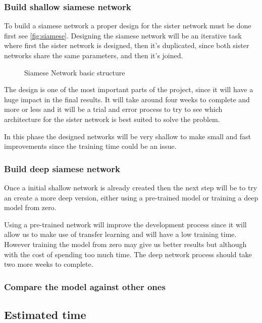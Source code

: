 \subsubsection{Build shallow siamese network}

To build a siamese network a proper design for the sister network must be done first
see \autoref{fig:siamese}. Designing the siamese network will be an iterative task where first
the sister network is designed, then it's duplicated, since both sister networks share the
same parameters, and then it's joined.

\begin{figure}
  \centering
  
  \caption{Siamese Network basic structure \label{fig:siamese}}
\end{figure}

The design is one of the most important parts of the project, since it will have a huge
impact in the final results. It will take around four weeks to complete and more or less
and it will be a trial and error process to try to see which architecture for the sister
network is best suited to solve the problem.

In this phase the designed networks will be very shallow to make small and fast improvements
since the training time could be an issue.

\subsubsection{Build deep siamese network}

Once a initial shallow network is already created then the next step will be to try an create
a more deep version, either using a pre-trained model or training a deep model from zero.

Using a pre-trained network will improve the development process since it will allow us
to make use of transfer learning and will have a low training time. However training the model
from zero may give us better results but although with the cost of spending too much time.
The deep network process should take two more weeks to complete.

\subsubsection{Compare the model against other ones}

\subsection{Estimated time}

